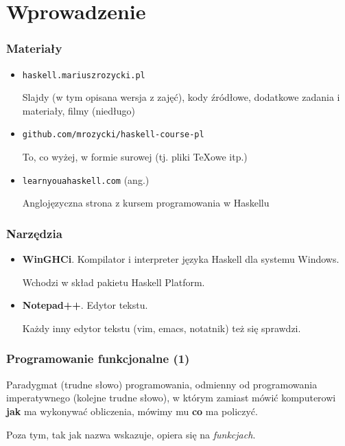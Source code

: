\section{Wprowadzenie}
\sectionframe

\begin{frame}
  \frametitle{Materiały}

  \begin{itemize}
    \item {
      \texttt{haskell.mariuszrozycki.pl}

      Slajdy (w tym opisana wersja z zajęć), kody źródłowe,
      dodatkowe zadania i materiały, filmy (niedługo)
      \vspace{1em}
    }
    \item {
      \texttt{github.com/mrozycki/haskell-course-pl}

      To, co wyżej, w formie surowej (tj. pliki \TeX{}owe itp.)
      \vspace{1em}
    }
    \item {
      \texttt{learnyouahaskell.com} (ang.)

      Anglojęzyczna strona z kursem programowania w Haskellu
      \vspace{1em}
    }
  \end{itemize}
\end{frame}

\begin{frame}
  \frametitle{Narzędzia}
  \begin{itemize}
    \item {
      \textbf{WinGHCi}. 
      Kompilator i interpreter języka Haskell dla systemu Windows.

      Wchodzi w skład pakietu Haskell Platform.
      \vspace{1em}
    }
    \item {
      \textbf{Notepad++}. Edytor tekstu.

      Każdy inny edytor tekstu (vim, emacs, notatnik) też się sprawdzi.
    }
  \end{itemize}
\end{frame}

\begin{frame}
  \frametitle{Programowanie funkcjonalne (1)}
  Paradygmat (trudne słowo) programowania, odmienny od programowania
  imperatywnego (kolejne trudne słowo), w którym zamiast mówić komputerowi
  \textbf{jak} ma wykonywać obliczenia, mówimy mu \textbf{co} ma policzyć.
  \vspace{1em}

  Poza tym, tak jak nazwa wskazuje, opiera się na \textit{funkcjach}.
\end{frame}

